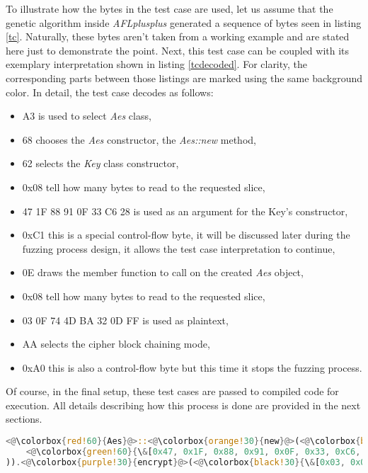 To illustrate how the bytes in the test case are used, let us assume that the genetic algorithm inside \textit{AFLplusplus} generated a sequence of bytes seen in listing \ref{tc}. Naturally, these bytes aren't taken from a working example and are stated here just to demonstrate the point. Next, this test case can be coupled with its exemplary interpretation shown in listing \ref{tcdecoded}. For clarity, the corresponding parts between those listings are marked using the same background color. In detail, the test case decodes as follows:
\begin{itemize}
    \item \colorbox{red!60}{A3} is used to select \textit{Aes} class,
    \item \colorbox{orange!30}{68} chooses the \textit{Aes} constructor, the \textit{Aes::new} method,
    \item \colorbox{blue!30}{62} selects the \textit{Key} class constructor,
    \item \colorbox{green!75}{0x08} tell how many bytes to read to the requested slice,
    \item \colorbox{green!60}{47 1F 88 91 0F 33 C6 28} is used as an argument for the Key's constructor,
    \item \colorbox{brown!30}{0xC1} this is a special control-flow byte, it will be discussed later during the fuzzing process design, it allows the test case interpretation to continue,
    \item \colorbox{purple!30}{0E} draws the member function to call on the created \textit{Aes} object,
    \item \colorbox{black!45}{0x08} tell how many bytes to read to the requested slice,
    \item \colorbox{black!30}{03 0F 74 4D BA 32 0D FF} is used as plaintext,
    \item \colorbox{yellow!60}{AA} selects the cipher block chaining mode,
    \item \colorbox{brown!60}{0xA0} this is also a control-flow byte but this time it stops the fuzzing process.
\end{itemize}
Of course, in the final setup, these test cases are passed to compiled code for execution. All details describing how this process is done are provided in the next sections. 

\begin{minipage}{\linewidth}
\begin{lstlisting}[language=rust,caption={Example of interpreted test case.},label={tcdecoded}]
<@\colorbox{red!60}{Aes}@>::<@\colorbox{orange!30}{new}@>(<@\colorbox{blue!30}{Key::new}@>(
    <@\colorbox{green!60}{\&[0x47, 0x1F, 0x88, 0x91, 0x0F, 0x33, 0xC6, 0x28]}@>
)).<@\colorbox{purple!30}{encrypt}@>(<@\colorbox{black!30}{\&[0x03, 0x0F, 0x74, 0x4D, 0xBA, 0x32, 0x0D, 0xFF]}@>, <@\colorbox{yellow!60}{AesMode::CBC}@>)
\end{lstlisting}
\end{minipage}

